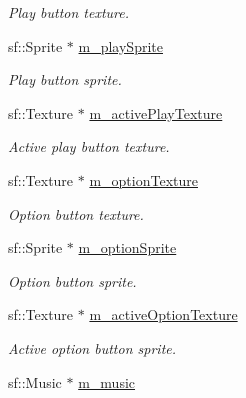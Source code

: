 \begin{DoxyCompactItemize}
\begin{DoxyCompactList}\small\item\em Play button texture. \end{DoxyCompactList}\item 
\hypertarget{class_menu_ab0d75798058fe23875912f4b7f51f61b}{sf\-::\-Sprite $\ast$ \hyperlink{class_menu_ab0d75798058fe23875912f4b7f51f61b}{m\-\_\-play\-Sprite}}\label{class_menu_ab0d75798058fe23875912f4b7f51f61b}

\begin{DoxyCompactList}\small\item\em Play button sprite. \end{DoxyCompactList}\item 
\hypertarget{class_menu_a365d6ab154c7a1f15bcd1b36973127c4}{sf\-::\-Texture $\ast$ \hyperlink{class_menu_a365d6ab154c7a1f15bcd1b36973127c4}{m\-\_\-active\-Play\-Texture}}\label{class_menu_a365d6ab154c7a1f15bcd1b36973127c4}

\begin{DoxyCompactList}\small\item\em Active play button texture. \end{DoxyCompactList}\item 
\hypertarget{class_menu_a4abba58c2015794ec73539013b7c781d}{sf\-::\-Texture $\ast$ \hyperlink{class_menu_a4abba58c2015794ec73539013b7c781d}{m\-\_\-option\-Texture}}\label{class_menu_a4abba58c2015794ec73539013b7c781d}

\begin{DoxyCompactList}\small\item\em Option button texture. \end{DoxyCompactList}\item 
\hypertarget{class_menu_a2ec03c9cef485d448dda51c45380bb77}{sf\-::\-Sprite $\ast$ \hyperlink{class_menu_a2ec03c9cef485d448dda51c45380bb77}{m\-\_\-option\-Sprite}}\label{class_menu_a2ec03c9cef485d448dda51c45380bb77}

\begin{DoxyCompactList}\small\item\em Option button sprite. \end{DoxyCompactList}\item 
\hypertarget{class_menu_aec48becd56bbb565aaa14748b606e36e}{sf\-::\-Texture $\ast$ \hyperlink{class_menu_aec48becd56bbb565aaa14748b606e36e}{m\-\_\-active\-Option\-Texture}}\label{class_menu_aec48becd56bbb565aaa14748b606e36e}

\begin{DoxyCompactList}\small\item\em Active option button sprite. \end{DoxyCompactList}\item 
\hypertarget{class_menu_a42a8c6699db56e7dd57558c0824caa44}{sf\-::\-Music $\ast$ \hyperlink{class_menu_a42a8c6699db56e7dd57558c0824caa44}{m\-\_\-music}}\label{class_menu_a42a8c6699db56e7dd57558c0824caa44}


\end{DoxyCompactItemize}
